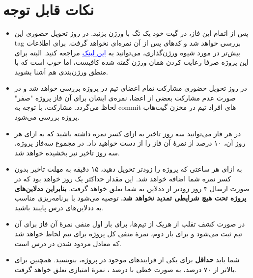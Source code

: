 \documentclass[]{article}
\begin{document}
\newpage
\pagestyle{fancy}
\fancyhf{}
\fancyfoot{}
\cfoot{\thepage}
\renewcommand{\headrulewidth}{2pt}

\KashidaOff



\tableofcontents

\newpage

 \Large \textbf{\\\\
}


\section*{{\titr نکات قابل توجه}}
\begin{itemize}
\item
پس از اتمام این فاز، در گیت خود یک تگ با ورژن  بزنید. در روز تحویل حضوری این tag بررسی خواهد شد و کدهای پس از آن نمره‌ای نخواهد گرفت. برای اطلاعات بیش‌تر در مورد شیوه ورژن‌گذاری، می‌توانید به
 \href{https://semver.org/}{\textcolor{blue}{\underline{این لینک}}}
 مراجعه کنید. البته برای این پروژه صرفا رعایت کردن همان ورژن گفته شده کافیست، اما خوب‌ است که با منطق ورژن‌بندی هم آشنا بشوید.

\item
در روز تحویل حضوری مشارکت تمام اعضای تیم در پروژه بررسی خواهد‌ شد و در صورت عدم مشارکت بعضی از اعضا، نمره‌ی ایشان برای آن فاز پروژه "صفر" لحاظ می‌گردد. مشارکت، با توجه به commit های افراد تیم در مخزن گیت‌هاب پروژه بررسی می‌شود.

\item
در هر فاز می‌توانید سه روز تاخیر به ازای کسر نمره داشته‌ باشید که به ازای هر روز آن، ۱۰ درصد از نمرهٔ آن فاز را از دست خواهید‌ داد. در مجموع سه‌فاز پروژه، سه روز تاخیر نیز بخشیده خواهد‌ شد.

\item
به ازای هر ساعتی که پروژه را زودتر تحویل دهید، ۱۵ دقیقه به مهلت تاخیر بدون کسر نمره شما اضافه خواهد‌ شد. این مقدار حداکثر یک روز خواهد‌ بود که در صورت ارسال ۴ روز زودتر از ددلاین به شما تعلق خواهد گرفت. \textbf{بنابراین ددلاین‌های پروژه تحت هیچ شرایطی تمدید نخواهد‌ شد.} توصیه می‌شود با برنامه‌ریزی مناسب به ددلاین‌های درس پایبند باشید.

\item
در صورت کشف تقلب از هریک از تیم‌ها، برای بار اول منفی نمرهٔ آن فاز برای آن تیم ثبت می‌شود و برای بار دوم، نمرهٔ منفی کل پروژه برای تیم لحاظ خواهد‌ شد که معادل مردود شدن در درس است.


\item
شما باید \textbf{حداقل} برای یکی از فرایندهای موجود در پروژه،  بنویسید. همچنین برای  بالاتر از ۷۰ درصد، به صورت خطی با درصد ، نمره‌ٔ امتیازی تعلق خواهد گرفت.

\end{itemize}
\end{document}
